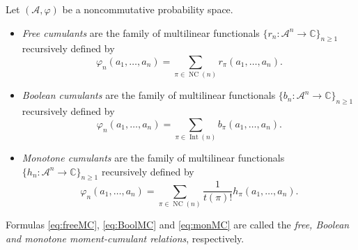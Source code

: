 \documentclass[pdftex]{sigma}%
\numberwithin{equation}{section}
\newcommand{\A}{\mathcal{A}}
\newcommand{\NC}{\operatorname{NC}}
\newcommand{\Int}{\operatorname{Int}}
\begin{document}
\begin{Definition}
Let $(\A,\varphi)$ be a noncommutative probability space.
\begin{itemize}\itemsep=0pt
\item \textit{Free cumulants} are the family of multilinear functionals $\{r_n\colon \A^n\to\mathbb{C}\}_{n\geq1}$ recursively defined by~\cite{Spe94}
\begin{equation}\label{eq:freeMC}
\varphi_n(a_1,\dots,a_n) = \sum_{\pi\in \NC(n)} r_\pi(a_1,\dots,a_n).
\end{equation}
\item \textit{Boolean cumulants} are the family of multilinear functionals $\{b_n\colon \A^n\to\mathbb{C}\}_{n\geq1}$ recursively defined by~\cite{SW97}
\begin{equation}\label{eq:BoolMC}
\varphi_n(a_1,\dots,a_n) = \sum_{\pi\in \Int(n)} b_\pi(a_1,\dots,a_n).
\end{equation}
\item \textit{Monotone cumulants} are the family of multilinear functionals $\{h_n\colon \A^n\to\mathbb{C}\}_{n\geq1}$ recursively defined by~\cite{HS11b}
\begin{equation}\label{eq:monMC}
\varphi_n(a_1,\dots,a_n) = \sum_{\pi\in \NC(n)} \frac{1}{t(\pi)!} h_\pi(a_1,\dots,a_n).
\end{equation}
\end{itemize}

\end{Definition}
Formulas \eqref{eq:freeMC}, \eqref{eq:BoolMC} and \eqref{eq:monMC} are called the \textit{free, Boolean and monotone moment-cumulant relations}, respectively.

\if

\else
\end{document}
